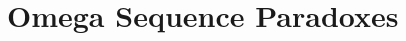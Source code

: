 ﻿%








\setcounter{section}{2} %




\section{Omega Sequence Paradoxes}

\begin{frame}

\scriptsize{\tableofcontents}

\end{frame}



